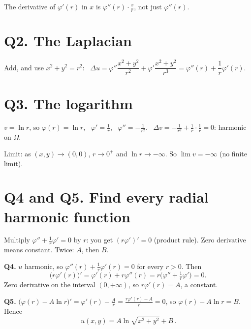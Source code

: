 \begin{watch}\watchout The derivative of $\varphi'(r)$ in $x$ is $\varphi''(r)\cdot\frac xr$, not just $\varphi''(r)$.\end{watch}

\section{Q2. The Laplacian}

\begin{writethis}
Add, and use $x^2+y^2=r^2$: \
$\Delta u=\varphi''\dfrac{x^2+y^2}{r^2}+\varphi'\dfrac{x^2+y^2}{r^3}=\varphi''(r)+\dfrac1r\varphi'(r).$
\end{writethis}

\section{Q3. The logarithm}

\begin{writethis}
$v=\ln r$, so $\varphi(r)=\ln r$, \ $\varphi'=\frac1r$, \ $\varphi''=-\frac1{r^2}$. \
$\Delta v=-\frac1{r^2}+\frac1r\cdot\frac1r=0$: harmonic on $\Omega$.

Limit: as $(x,y)\to(0,0)$, $r\to0^+$ and $\ln r\to-\infty$. So $\lim v=-\infty$ (no finite limit).
\end{writethis}

\section{Q4 and Q5. Find every radial harmonic function}

\begin{idea}
Multiply $\varphi''+\frac1r\varphi'=0$ by $r$: you get $(r\varphi')'=0$ (product rule). Zero derivative means constant. Twice: $A$, then $B$.
\end{idea}

\begin{writethis}
\textbf{Q4.} $u$ harmonic, so $\varphi''(r)+\frac1r\varphi'(r)=0$ for every $r>0$. Then
\[
  \big(r\varphi'(r)\big)'=\varphi'(r)+r\varphi''(r)=r\Big(\varphi''+\tfrac1r\varphi'\Big)=0 .
\]
\seeproof{8} Zero derivative on the interval $(0,+\infty)$, so $r\varphi'(r)=A$, a constant.

\textbf{Q5.} $\big(\varphi(r)-A\ln r\big)'=\varphi'(r)-\frac Ar=\frac{r\varphi'(r)-A}{r}=0$, so
$\varphi(r)-A\ln r=B$. Hence
\[
  \boxed{\,u(x,y)=A\ln\sqrt{x^2+y^2}+B\,}.
\]
\end{writethis}

